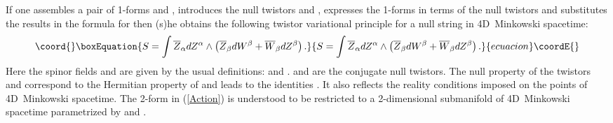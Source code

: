 \documentclass[a4paper,twocolumn,showkeys,showpacs,aps]{revtex4}
\begin{document}
If one assembles a pair of 1-forms \coordHE{} and \coordHE{}, introduces the null twistors
\coordHE{} and \coordHE{}, expresses the 1-forms in terms of the
null twistors and substitutes the results in the formula for
\coordHE{} then (s)he obtains the following
twistor variational principle for a null string in 4D~Minkowski
spacetime:
\begin{equation}\coord{}\boxEquation{
S = \int \overline{Z}_\alpha dZ^\alpha \wedge \left(
\overline{Z}_\beta dW^\beta + \overline{W}_\beta dZ^\beta
\right).
\label{Action}
}{
S = \int \overline{Z}_\alpha dZ^\alpha \wedge \left(
\overline{Z}_\beta dW^\beta + \overline{W}_\beta dZ^\beta
\right).
}{ecuacion}\coordE{}\end{equation}
Here the spinor fields \coordHE{} and \coordHE{} are
given by the usual definitions: \coordHE{} and \coordHE{}.
\coordHE{} and \coordHE{} are the conjugate
null twistors. The null property of the twistors \coordHE{} and
\coordHE{} correspond to the Hermitian property of \coordHE{} and
leads to the identities \coordHE{}. It also reflects the reality
conditions imposed on the points of 4D~Minkowski spacetime. The
2-form in (\ref{Action}) is understood to be restricted to a
2-dimensional submanifold of 4D~Minkowski spacetime parametrized
by \myHighlight{$\tau$}\coordHE{} and \myHighlight{$\sigma$}\coordHE{}.
\end{document}
